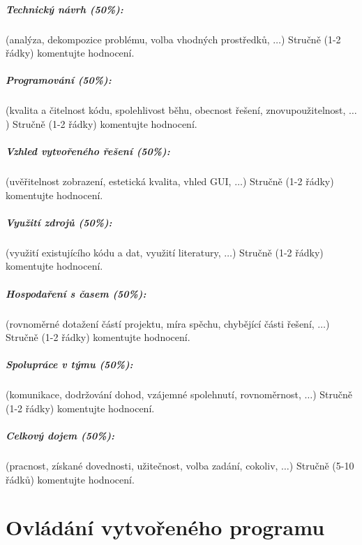 \documentclass[12pt,a4paper,titlepage,final]{report}
\begin{document}
\paragraph{Technický návrh (50\%):} (analýza, dekompozice problému, volba
vhodných prostředků, $\ldots$)
Stručně (1-2 řádky) komentujte hodnocení.

\paragraph{Programování (50\%):} (kvalita a čitelnost kódu, spolehlivost běhu,
obecnost řešení, znovupoužitelnost, $\ldots$)
Stručně (1-2 řádky) komentujte hodnocení.

\paragraph{Vzhled vytvořeného řešení (50\%):} (uvěřitelnost zobrazení,
estetická kvalita, vhled GUI, $\ldots$)
Stručně (1-2 řádky) komentujte hodnocení.

\paragraph{Využití zdrojů (50\%):} (využití existujícího kódu a dat, využití
literatury, $\ldots$)
Stručně (1-2 řádky) komentujte hodnocení.

\paragraph{Hospodaření s časem (50\%):} (rovnoměrné dotažení částí projektu,
míra spěchu, chybějící části řešení, $\ldots$)
Stručně (1-2 řádky) komentujte hodnocení.

\paragraph{Spolupráce v týmu (50\%):} (komunikace, dodržování dohod, vzájemné
spolehnutí, rovnoměrnost, $\ldots$)
Stručně (1-2 řádky) komentujte hodnocení.

\paragraph{Celkový dojem (50\%):} (pracnost, získané dovednosti, užitečnost,
volba zadání, cokoliv, $\ldots$)
Stručně (5-10 řádků) komentujte hodnocení.

\chapter{Ovládání vytvořeného programu}
\end{document}

